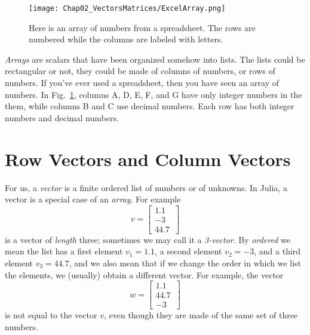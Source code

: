 \vspace*{1cm}

    \begin{figure}[h!]
\centering
\texttt{[image: Chap02\_VectorsMatrices/ExcelArray.png]}
\caption{Here is an array of numbers from a spreadsheet. The rows are numbered while the columns are labeled with letters. }
    \label{fig:Chapt2:spreasheet}
\end{figure}
\newpage

\textit{Arrays} are scalars that have been organized somehow into lists. The lists could be rectangular or not, they could be made of columns of numbers, or rows of numbers. If you've ever used a spreadsheet, then you have seen an array of numbers. In Fig.~\ref{fig:Chapt2:spreasheet}, columns A, D, E, F, and G have only integer numbers in the them, while columns B and C use decimal numbers. Each row has both integer numbers and decimal numbers.


\section{Row Vectors and Column Vectors}

For us, a \textit{vector} is a finite ordered list of numbers or of unknowns. In Julia, a vector is a special case of an \textit{array}. For example 
\begin{equation}
    \label{eq:firstColumnVector}
    v=\left[\begin{array}{r} 1.1 \\ -3~~~ \\ 44.7 \end{array} \right]
\end{equation}
is a vector of \textit{length} three; sometimes we may call it a \textit{3-vector}. By \textit{ordered} we mean the list has a first element $v_1=1.1$, a second element $v_2=-3$, and a third element $v_3=44.7$, and we also mean that if we change the order in which we list the elements, we (usually) obtain a different vector. For example, the vector 
\begin{equation}
    \label{eq:secondColumnVector}
    w=\left[\begin{array}{r} 1.1 \\  44.7 \\ -3~~~  \end{array} \right]
\end{equation}
is not equal to the vector $v$, even though they are made of the same set of three numbers. \\


